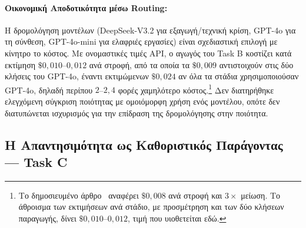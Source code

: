 \paragraph{Οικονομική Αποδοτικότητα μέσω Routing:}
Η δρομολόγηση μοντέλων (DeepSeek-V3.2 για εξαγωγή/τεχνική κρίση, GPT-4o για τη σύνθεση, GPT-4o-mini για ελαφριές εργασίες) είναι σχεδιαστική επιλογή με κίνητρο το κόστος. Με ονομαστικές τιμές API, ο αγωγός του Task B κοστίζει κατά εκτίμηση $\$0{,}010$--$0{,}012$ ανά στροφή, από τα οποία τα $\$0{,}009$ αντιστοιχούν στις δύο κλήσεις του GPT-4o, έναντι εκτιμώμενων $\$0{,}024$ αν όλα τα στάδια χρησιμοποιούσαν GPT-4o, δηλαδή περίπου $2$--$2{,}4$ φορές χαμηλότερο κόστος.\footnote{Το δημοσιευμένο άρθρο~\citep{athanasiou2026ailsntua} αναφέρει $\$0{,}008$ ανά στροφή και $3\times$ μείωση. Το άθροισμα των εκτιμήσεων ανά στάδιο, με προσμέτρηση και των δύο κλήσεων παραγωγής, δίνει $\$0{,}010$--$0{,}012$, τιμή που υιοθετείται εδώ.} Δεν διατηρήθηκε ελεγχόμενη σύγκριση ποιότητας με ομοιόμορφη χρήση ενός μοντέλου, οπότε δεν διατυπώνεται ισχυρισμός για την επίδραση της δρομολόγησης στην ποιότητα.

\subsection{Η Απαντησιμότητα ως Καθοριστικός Παράγοντας --- Task C}

